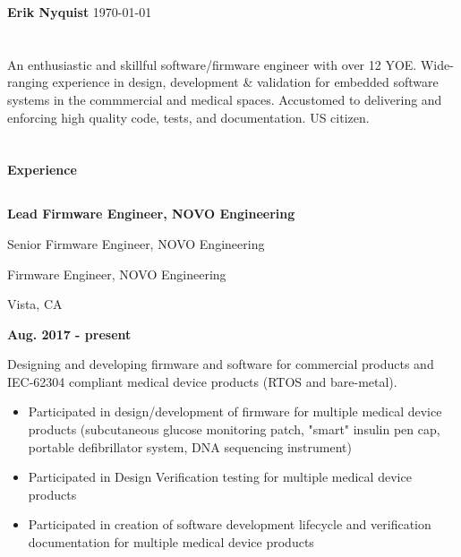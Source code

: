\documentclass[6pt]{article}
\begin{document}
\begin{minipage}{38em}
\bigskip{}
\bigskip{}
\bigskip{}
%
%
{\Huge \bfseries Erik Nyquist}
{\hfill \today}
\section*{}
\begin{flushleft}
An enthusiastic and skillful software/firmware engineer with over 12 YOE. Wide-ranging
experience in design, development \& validation for embedded software systems in the
commmercial and medical spaces. Accustomed to delivering and enforcing high quality code,
tests, and documentation. US citizen.
\end{flushleft}
\section*{}
{\Large \bfseries Experience}

\dotfill
\vspace{-0.8em}
%
%
\subsection*{}
\begin{minipage}[b]{24em}
{\bfseries Lead Firmware Engineer, NOVO Engineering

Senior Firmware Engineer, NOVO Engineering

Firmware Engineer, NOVO Engineering

Vista, CA}
\end{minipage}
\hfill
\begin{minipage}[b]{10em}
{\bfseries Aug. 2017 - present}
\end{minipage}
\begin{flushleft}
Designing and developing firmware and software for commercial products and IEC-62304
compliant medical device products (RTOS and bare-metal).
\begin{itemize}
    \item Participated in design/development of firmware for multiple medical
          device products (subcutaneous glucose monitoring patch, "smart" insulin pen
          cap, portable defibrillator system, DNA sequencing instrument)
    \item Participated in Design Verification testing for multiple medical device products
    \item Participated in creation of software development lifecycle and
          verification documentation for multiple medical device products
\end{itemize}
\end{flushleft}
\dotfill
\vspace{-0.8em}
%
%

\end{minipage}
\end{document}
